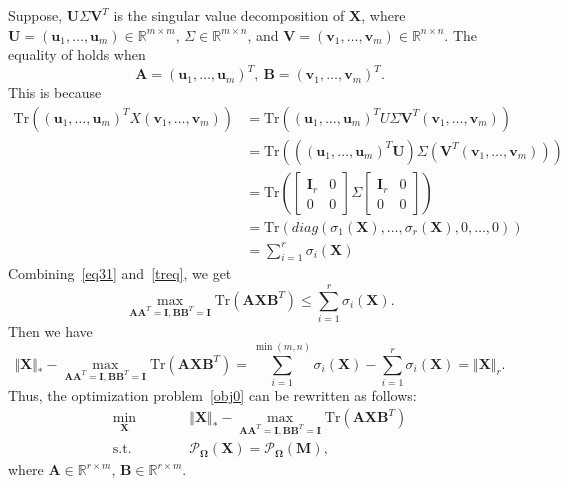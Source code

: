 \documentclass{article}
\begin{document}
{Suppose, $\mathbf U\mathbf \varSigma\mathbf V^T$ is the singular value decomposition of $\mathbf X$, where $\mathbf U = (\bm u_1,\dots,\bm u_m) \in \mathbb{R}^{m \times m}$, $\Sigma \in \mathbb{R}^{m \times n}$, and $\mathbf V = (\bm v_1,\dots,\bm v_m) \in \mathbb{R}^{n \times n}$. The equality of holds when 
\begin{equation}
    \mathbf A = (\bm u_1,\dots,\bm u_m)^T, \ \mathbf B = (\bm v_1,\dots,\bm v_m)^T.
    \label{}
\end{equation}
This is because
\begin{equation}
    \begin{aligned}
        \text{Tr} ((\bm u_1,\dots,\bm u_m)^TX(\bm v_1,\dots,\bm v_m))
        & = \text{Tr} ((\bm u_1,\dots,\bm u_m)^TU\mathbf \varSigma\mathbf V^T(\bm v_1,\dots,\bm v_m)) \\
        & = \text{Tr} (((\bm u_1,\dots,\bm u_m)^T\mathbf U) \mathbf \varSigma (\mathbf V^T(\bm v_1,\dots,\bm v_m))) \\
        & = \text{Tr} \left( \begin{bmatrix}
            \mathbf I_r & 0\\
            0 & 0 
        \end{bmatrix} \Sigma \begin{bmatrix}
            \mathbf I_r & 0\\
            0 & 0 
        \end{bmatrix}
        \right) \\
        & = \text{Tr}(diag(\sigma_1(\mathbf X),\dots,\sigma_r(\mathbf X),0,\dots,0)) \\
        & = \sum_{i=1}^r \sigma_i(\mathbf X)	
    \end{aligned}
    \label{treq}
\end{equation}
Combining~\eqref{eq31} and~\eqref{treq}, we get
\begin{equation}
    \underset{\mathbf A\mathbf A^T=\mathbf I,\mathbf B\mathbf B^T=\mathbf I}{\max} \text{Tr}(\mathbf A\mathbf X\mathbf B^T) \leq \sum_{i=1}^r \sigma_i(\mathbf X).
\end{equation}
Then we have 
\begin{equation}
    \Vert\mathbf X \Vert_* - \underset{\mathbf A\mathbf A^T=\mathbf I,\mathbf B\mathbf B^T=\mathbf I}{\max} \text{Tr}(\mathbf A\mathbf X\mathbf B^T)  
        = \sum_{i=1}^{\min(m,n)} \sigma_i(\mathbf X) - \sum_{i=1}^r \sigma_i(\mathbf X) 
        = \Vert\mathbf X \Vert_r.
\end{equation}
Thus, the optimization problem~\eqref{obj0} can be rewritten as follows:
\begin{equation}
\begin{aligned}
    \min_{\mathbf X}\qquad&\quad  \Vert\mathbf X \Vert_* - \underset{\mathbf A\mathbf A^T=\mathbf I,\mathbf B\mathbf B^T=\mathbf I}{\max} \text{Tr}(\mathbf A\mathbf X\mathbf B^T) \\
    \text{s.t.}\qquad&\quad  \mathcal{P}_{\mathbf\Omega}(\mathbf X) =  \mathcal{P}_{\mathbf\Omega}(\mathbf M),
\end{aligned}\label{obj1}
\end{equation}
where $\mathbf A \in \mathbb{R}^{r \times m}$, $\mathbf B \in \mathbb{R}^{r \times m}$.

}
\end{document}
